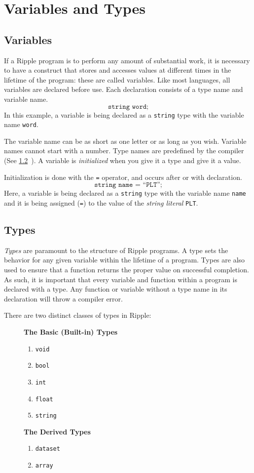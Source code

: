 \documentclass{article}
\newcommand{\code}{\texttt}
\begin{document}
\section{Variables and Types}

\subsection{Variables}
If a Ripple program is to perform any amount of substantial work, it is necessary to have a construct that stores and accesses values at different times in the lifetime of the program: these are called variables. Like most languages, all variables are declared before use. Each declaration consists of a type name and variable name.
\[ \code{string word;} \]
In this example, a variable is being declared as a \code{string} type with the variable name \code{word}. 

The variable name can be as short as one letter or as long as you wish. Variable names cannot start with a number. Type names are predefined by the compiler (See \cref{sec:types}~). A variable is \emph{initialized} when you give it a type and give it a value. 

Initialization is done with the \code{=} operator, and occurs after or with declaration. 
\[ \code{string name = ``PLT'';} \]
Here, a variable is being declared as a \code{string} type with the variable name \code{name} and it is being assigned (\code{=}) to the value of the \emph{string literal} \code{PLT}. 

\subsection{Types}\label{sec:types}
\emph{Types} are paramount to the structure of Ripple programs. A type sets the behavior for any given variable within the lifetime of a program. Types are also used to ensure that a function returns the proper value on successful completion. As such, it is important that every variable and function within a program is declared with a type. Any function or variable without a type name in its declaration will throw a compiler error.

There are two distinct classes of types in Ripple:
\begin{description}
\item[] \textbf{The Basic (Built-in) Types}
\begin{enumerate}
\item \code{void}
\item \code{bool}
\item \code{int}
\item \code{float}
\item \code{string}
\end{enumerate}
\item[] \textbf{The Derived Types}
\begin{enumerate}
\item \code{dataset}
\item \code{array}
\end{enumerate} 
\end{description}
\end{document}
